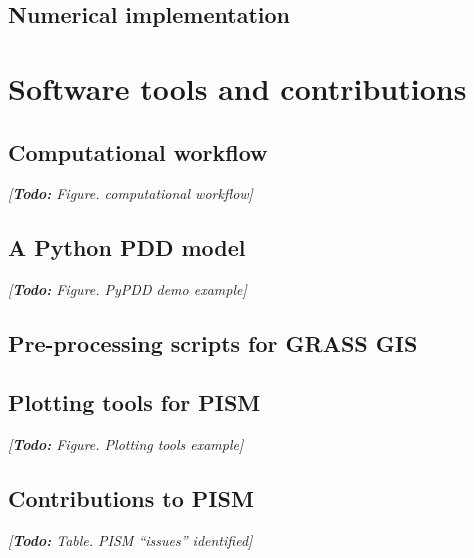 \documentclass{article}
\newcommand{\todo}[1]{\emph{[\textbf{Todo:} #1]}}
\begin{document}
\subsection{Numerical implementation}

\section{Software tools and contributions}

\subsection{Computational workflow}
\todo{Figure. computational workflow}

\subsection{A Python PDD model}
\todo{Figure. PyPDD demo example}

\subsection{Pre-processing scripts for GRASS GIS}

\subsection{Plotting tools for PISM}
\todo{Figure. Plotting tools example}

\subsection{Contributions to PISM}
\todo{Table. PISM ``issues'' identified}
\end{document}
